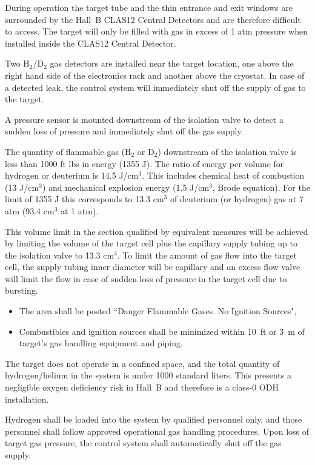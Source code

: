 During operation the target tube and the thin entrance and exit windows are 
surrounded by the Hall~B CLAS12 Central Detectors and are therefore difficult 
to access.  The target will only be filled with gas in excess of 1 atm pressure 
when installed inside the CLAS12 Central Detector.

Two H$_2$/D$_2$ gas detectors are installed near the target location, one above 
the right hand side of the electronics rack and another above the cryostat. In 
case of a detected leak, the control system will immediately shut off the 
supply of gas to the target.

A pressure sensor is mounted downstream of the isolation valve to detect a 
sudden loss of pressure and immediately shut off the gas supply.

The quantity of flammable gas (H$_2$ or D$_2$) downstream of the isolation 
valve is less than 1000 ft lbs in energy (1355 J). The ratio of energy per 
volume for hydrogen or deuterium is 14.5 J/cm$^3$. This includes chemical heat 
of combustion (13 J/cm$^3$) and mechanical explosion energy (1.5 J/cm$^3$, 
Brode equation).  For the limit of 1355 J this corresponds to 13.3 cm$^3$ of 
deuterium (or hydrogen) gas at 7 atm (93.4 cm$^3$ at 1 atm).

This volume limit in the section qualified by equivalent measures will be 
achieved by limiting the volume of the target cell plus the capillary supply 
tubing up to the isolation valve to 13.3 cm$^3$. To limit the amount of gas 
flow into the target cell, the supply tubing inner diameter will be capillary 
and an excess flow valve will limit the flow in case of sudden loss of pressure 
in the target cell due to bursting.

\begin{itemize}
\item The area shall be posted ``Danger Flammable Gases.  No Ignition Sources",
\item Combustibles and ignition sources shall be minimized within 10~ft or 3~m 
   of target's gas handling equipment and piping.
\end{itemize}

The target does not operate in a confined space, and the total quantity of 
hydrogen/helium in the system is under 1000 standard liters. This presents a 
negligible oxygen deficiency risk in Hall~B and therefore is a class-0 ODH 
installation.

Hydrogen shall be loaded into the system by qualified personnel only, and those 
personnel shall follow approved operational gas handling procedures.   Upon 
loss of target gas pressure, the control system shall automatically shut off 
the gas supply. 


